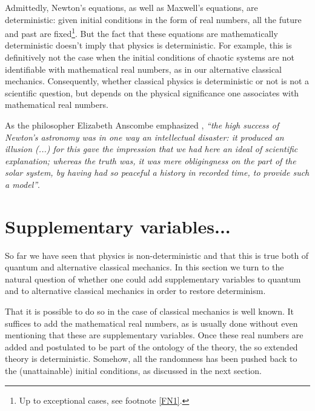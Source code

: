 \documentclass[floatfix,12pt]{article}
\begin{document}
Admittedly, Newton's equations, as well as Maxwell's equations, are deterministic: given initial conditions in the form of real numbers, all the future and past are fixed\footnote{Up to exceptional cases, see footnote \ref{FN1}.}. But the fact that these equations are mathematically deterministic doesn't imply that physics is deterministic. For example, this is definitively not the case when the initial conditions of chaotic systems are not identifiable with mathematical real numbers, as in our alternative classical mechanics. Consequently, whether classical physics is deterministic or not is not a scientific question, but depends on the physical significance one associates with mathematical real numbers.

As the philosopher Elizabeth Anscombe emphasized \cite{Anscombe}, {\it ``the high success of Newton’s astronomy was in one way an intellectual disaster: it produced an illusion (...) for this gave the impression that we had here an ideal of scientific explanation; whereas the truth was, it was mere obligingness on the part of the solar system, by having had so peaceful a history in recorded time, to provide such a model''}.


\section{Supplementary variables...}\label{suppvar}
So far we have seen that physics is non-deterministic and that this is true both of quantum \cite{GisinQchance14} and alternative classical mechanics. In this section we turn to the natural question of whether one could add supplementary variables to quantum and to alternative classical mechanics in order to restore determinism. 

That it is possible to do so in the case of classical mechanics is well known. It suffices to add the mathematical real numbers, as is usually done without even mentioning that these are supplementary variables. Once these real numbers are added and postulated to be part of the ontology of the theory, the so extended theory is deterministic. Somehow, all the randomness has been pushed back to the (unattainable) initial conditions, as discussed in the next section. 
\end{document}
